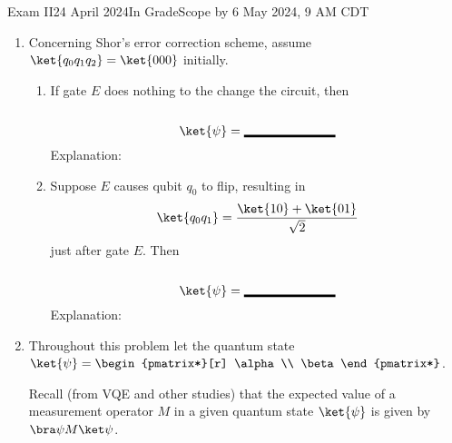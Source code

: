 \documentclass[12pt]{article}
\newcommand{\Blank}[1][1in]{\mbox{\vrule width #1 depth 2pt}\vrule width 0pt height 2.2em}
\def\SQB#1#2{%
\ensuremath{%
\begin{pmatrix*}[r] #1 \\ #2\end{pmatrix*}}}
\begin{document}
\begin{assignment}{Exam II}{24 April 2024}{In GradeScope by 6 May 2024, 9 AM CDT}
\begin{enumerate}
\clearpage\item{}
Concerning Shor's error correction scheme, assume $\ket{q_{0}q_{1}q_{2}}=\ket{000}$ initially.
\begin{center}
\end{center}

\begin{enumerate}
    \item{} If gate $E$ does nothing to the change the circuit, then
    \[
    \ket{\psi} = \Blank{}
    \]
    Explanation:
    \LeaveSpace{1in}
    \item{} Suppose $E$ causes qubit $q_0$ to flip, resulting in
    \[
    \ket{q_{0}q_{1}} = \frac{\ket{10}+\ket{01}}{\sqrt{2}}
    \]
    just after gate $E$.  Then
        \[
    \ket{\psi} = \Blank{}
    \]
    Explanation:
    \LeaveSpace{1in}
\end{enumerate}

\clearpage\item{}
Throughout this problem let the quantum state
\( \ket{\psi} = \SQB{\alpha}{\beta} \).

Recall (from VQE and other studies) that the expected value of a measurement operator $M$ in a given quantum state $\ket{\psi}$ is given by
\( \ExpVal{M}{\psi} \).


\end{enumerate}
\end{assignment}
\end{document}
